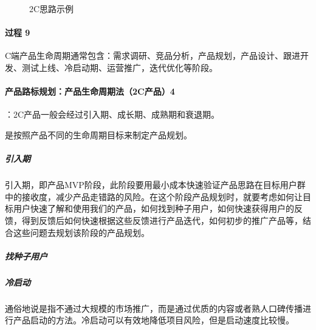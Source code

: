 \documentclass[letterpaper,10pt,english]{sphinxmanual}
\begin{document}
\begin{figure}[H]
\centering
\capstart

\noindent{}
\caption{2C思路示例}\label{\detokenize{chapter_introduction/2C:id28}}\end{figure}


\paragraph{过程 9\sphinxfootnotemark[112]}
\label{\detokenize{chapter_introduction/2C:id12}}%
\begin{footnotetext}[112]\sphinxAtStartFootnote
{}
%
\end{footnotetext}\ignorespaces 
C端产品生命周期通常包含：需求调研、竞品分析，产品规划，产品设计、跟进开发、测试上线、冷启动期、运营推广，迭代优化等阶段。


\paragraph{产品路标规划：产品生命周期法（2C产品）4\sphinxfootnotemark[113]}
\label{\detokenize{chapter_introduction/2C:c-4}}%
\begin{footnotetext}[113]\sphinxAtStartFootnote
{}
%
\end{footnotetext}\ignorespaces 
{}：2C产品一般会经过引入期、成长期、成熟期和衰退期。
\begin{center}\end{center}

是按照产品不同的生命周期目标来制定产品规划。


\subparagraph{引入期}
\label{\detokenize{chapter_introduction/2C:id13}}
引入期，即产品MVP阶段，此阶段要用最小成本快速验证产品思路在目标用户群中的接收度，减少产品走错路的风险。在这个阶段产品规划时，就要考虑如何让目标用户快速了解和使用我们的产品，如何找到种子用户，如何快速获得用户的反馈，得到反馈后如何快速根据这些反馈进行产品迭代，如何初步的推广产品等，结合这些问题去规划该阶段的产品规划。


\subparagraph{找种子用户}
\label{\detokenize{chapter_introduction/2C:id14}}

\subparagraph{冷启动}
\label{\detokenize{chapter_introduction/2C:id15}}
%
\begin{footnote}[114]\sphinxAtStartFootnote
{}
%
\end{footnote}通俗地说是指不通过大规模的市场推广，而是通过优质的内容或者熟人口碑传播进行产品启动的方法。冷启动可以有效地降低项目风险，但是启动速度比较慢。
\end{document}
